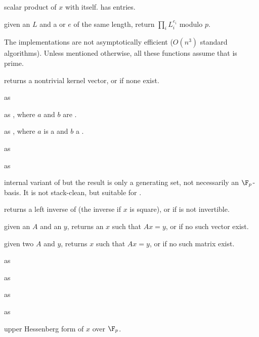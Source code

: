  scalar product of $x$ with itself.
has  entries.

 given an  $L$
and a  or  $e$ of the same length, return $\prod_i L_i^{e_i}$
modulo $p$.

 The implementations are not
asymptotically efficient ($O(n^3)$ standard algorithms). Unless mentioned
otherwise, all these functions assume that  is prime.

 returns a nontrivial kernel vector,
or  if none exist.

 as 

 as , where $a$ and
$b$ are .

 as , where $a$
is a  and $b$ a .

 as 

 as 

 internal variant of
 but the result is only a generating set, not
necessarily an $\F_p$-basis. It is not stack-clean, but suitable for
.

 returns a left inverse of 
(the inverse if $x$ is square), or  if  is not invertible.

 given an  $A$ and an  $y$, returns an $x$ such that $Ax =
 y$, or  if no such vector exist.

given two  $A$ and $y$, returns $x$ such that $Ax = y$, or 
if no such matrix exist.

 as 

 as 

 as 

 as 

 upper Hessenberg form of $x$ over $\F_p$.

